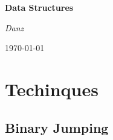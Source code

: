 \documentclass[landscape, letterpaper, openany]{book}
\newcommand{\includecpp}[2]{
    \section{#1} 
}
\begin{document}
\begin{titlepage}
    \centering
    \vspace*{5cm}
    {\Huge\bfseries Data Structures\par}
    \vspace{2cm}
    {\Large\itshape Danz\par}
    \vfill
    \today
\end{titlepage}

\tableofcontents 


\chapter{Techinques}
\includecpp{Binary Jumping}{binary\_jumping.cpp}
\end{document}
